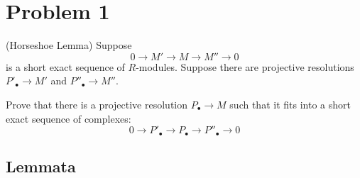 \section*{Problem 1}

(Horseshoe Lemma)
Suppose
\[0 \rightarrow M' \rightarrow M \rightarrow M'' \rightarrow 0\]
is a short exact sequence of \(R\)-modules.
Suppose there are projective resolutions
\(P'_\bullet \to M'\)
and
\(P''_\bullet \to M''\).

Prove that there is a projective resolution \(P_\bullet \to M\)
such that it fits into a short exact sequence of complexes:
\[0 \rightarrow P'_\bullet \rightarrow P_\bullet \rightarrow P''_\bullet \rightarrow 0\]

\subsection*{Lemmata}

